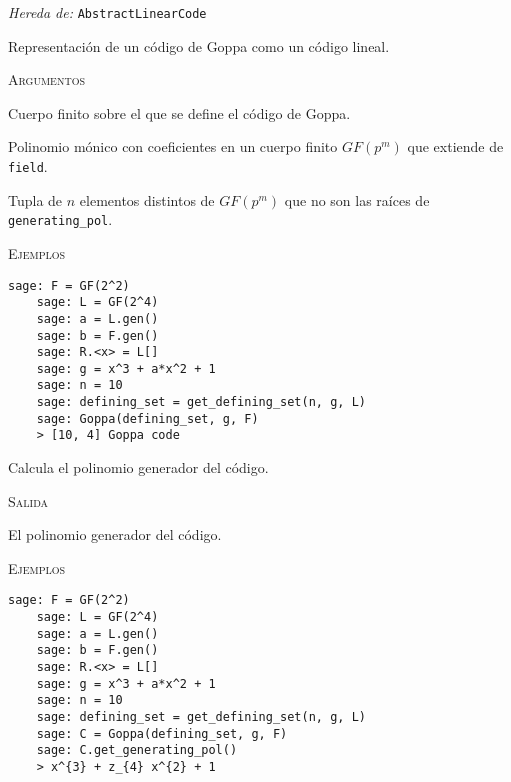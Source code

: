 \begin{description}[leftmargin=1em, font=\normalfont\ttfamily, style=nextline]
  \item[class Goppa(self, defining\_set, generating\_pol, field)]

  \emph{Hereda de:} \texttt{AbstractLinearCode}

Representación de un código de Goppa como un código lineal.

\textsc{Argumentos}
\begin{description}[font=\normalfont\ttfamily]
  \item[field] Cuerpo finito sobre el que se define el código de Goppa.
  \item[generating\_pol] Polinomio mónico con coeficientes en un cuerpo finito $GF(p^m)$ que extiende de \texttt{field}.
  \item[defining\_set] Tupla de $n$ elementos distintos de $GF(p^m)$ que no son las raíces de \texttt{generating\_pol}.
\end{description}

\textsc{Ejemplos}
  \begin{lstlisting}[gobble=4]
    sage: F = GF(2^2)
    sage: L = GF(2^4)
    sage: a = L.gen()
    sage: b = F.gen()
    sage: R.<x> = L[]
    sage: g = x^3 + a*x^2 + 1
    sage: n = 10
    sage: defining_set = get_defining_set(n, g, L)
    sage: Goppa(defining_set, g, F)
    > [10, 4] Goppa code
  \end{lstlisting}

\begin{description}[font=\ttfamily, style=nextline]
  \item[get\_generating\_pol(self)] Calcula el polinomio generador del código.
  
  \textsc{Salida}
  \begin{description}[font=\normalfont\ttfamily]
    \item[] El polinomio generador del código.
  \end{description}

  \textsc{Ejemplos}
  \begin{lstlisting}[gobble=4]
    sage: F = GF(2^2)
    sage: L = GF(2^4)
    sage: a = L.gen()
    sage: b = F.gen()
    sage: R.<x> = L[]
    sage: g = x^3 + a*x^2 + 1
    sage: n = 10
    sage: defining_set = get_defining_set(n, g, L)
    sage: C = Goppa(defining_set, g, F)
    sage: C.get_generating_pol()
    > x^{3} + z_{4} x^{2} + 1
  \end{lstlisting}


\end{description}
\end{description}
